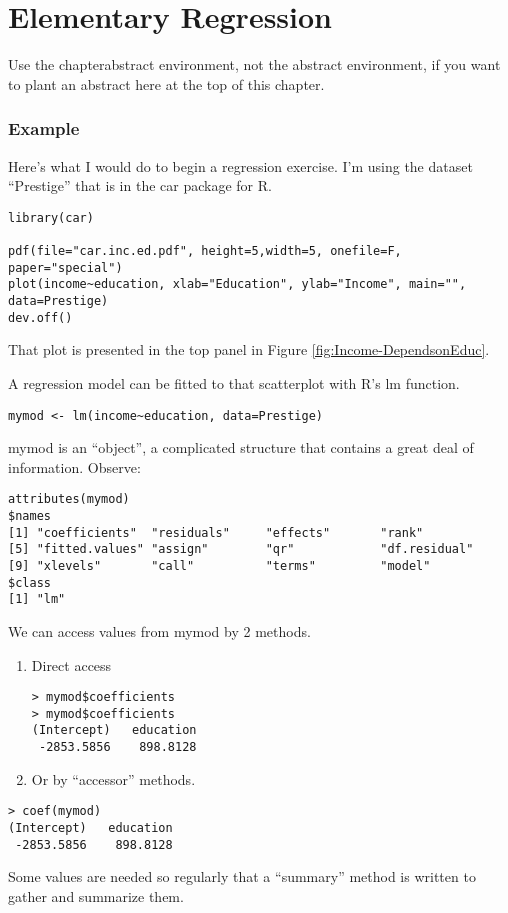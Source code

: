 
\chapter{Elementary Regression}

\begin{chapterabstract}
Use the chapterabstract environment, not the abstract environment, if you want to plant an abstract here at the top of this chapter.
\end{chapterabstract}

\subsection{Example}

Here's what I would do to begin a regression exercise. I'm using the
dataset ``Prestige'' that is in the car package for R.

\begin{lstlisting}[breaklines=true]
library(car)

pdf(file="car.inc.ed.pdf", height=5,width=5, onefile=F, paper="special")
plot(income~education, xlab="Education", ylab="Income", main="", data=Prestige)
dev.off()
\end{lstlisting}
That plot is presented in the top panel in Figure \ref{fig:Income-DependsonEduc}. 

A regression model \citet{gelman_bayesian_2003}can be fitted to that
scatterplot with R's lm function.

\begin{lstlisting}
mymod <- lm(income~education, data=Prestige)
\end{lstlisting}
mymod is an ``object'', a complicated structure that contains a
great deal of information. Observe:

\begin{lstlisting}
attributes(mymod)
$names  
[1] "coefficients"  "residuals"     "effects"       "rank"           
[5] "fitted.values" "assign"        "qr"            "df.residual"    
[9] "xlevels"       "call"          "terms"         "model"        
$class 
[1] "lm" 
\end{lstlisting}
We can access values from mymod by 2 methods. 
\begin{enumerate}
\item Direct access 

\begin{lstlisting}
> mymod$coefficients
> mymod$coefficients
(Intercept)   education 
 -2853.5856    898.8128 
\end{lstlisting}
\item Or by ``accessor'' methods.
\end{enumerate}
\begin{lstlisting}
> coef(mymod)
(Intercept)   education 
 -2853.5856    898.8128 
\end{lstlisting}
Some values are needed so regularly that a ``summary'' method is
written to gather and summarize them.

